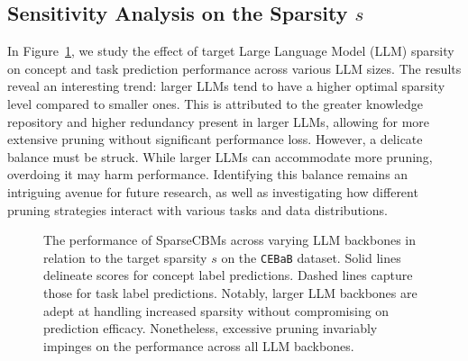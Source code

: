 \documentclass[letterpaper]{article} %
\begin{document}
\subsection{Sensitivity Analysis on the Sparsity $s$}
In Figure~\ref{fig:logit_0}, we study the effect of target Large Language Model (LLM) sparsity on concept and task prediction performance across various LLM sizes. The results reveal an interesting trend: larger LLMs tend to have a higher optimal sparsity level compared to smaller ones. This is attributed to the greater knowledge repository and higher redundancy present in larger LLMs, allowing for more extensive pruning without significant performance loss.
However, a delicate balance must be struck. While larger LLMs can accommodate more pruning, overdoing it may harm performance. Identifying this balance remains an intriguing avenue for future research, as well as investigating how different pruning strategies interact with various tasks and data distributions.    
\begin{figure}[t]
  \caption{The performance of SparseCBMs across varying LLM backbones in relation to the target sparsity $s$ on the \texttt{CEBaB} dataset. Solid lines delineate scores for concept label predictions. Dashed lines capture those for task label predictions. Notably, larger LLM backbones are adept at handling increased sparsity without compromising on prediction efficacy. Nonetheless, excessive pruning invariably impinges on the performance across all LLM backbones.}
  \label{fig:logit_0}
\end{figure}
\end{document}
